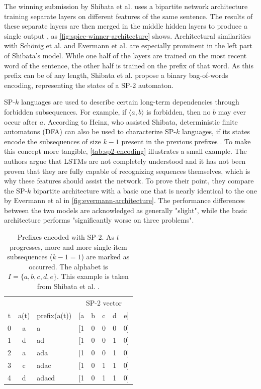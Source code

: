The winning submission by Shibata et al. uses a bipartite network architecture training separate layers on different features of the same sentence. The results of these separate layers are then merged in the middle hidden layers to produce a single output \cite{shibata2016bipartite}, as \autoref{fig:spice-winner-architecture} shows. Architectural similarities with Schönig et al. and Evermann et al. are especially prominent in the left part of Shibata's model.
While one half of the layers are trained on the most recent word of the sentence, the other half is trained on the prefix of that word. As this prefix can be of any length, Shibata et al. propose a binary bag-of-words encoding, representing the states of a SP-2 automaton.

SP-$k$ languages are used to describe certain long-term dependencies through forbidden subsequences. For example, if $\langle a,b \rangle$ is forbidden, then no $b$ may ever occur after $a$. According to Heinz, who assisted Shibata, deterministic finite automatons (DFA) can also be used to characterize SP-$k$ languages, if its states encode the subsequences of size $k-1$  present in the previous prefixes \cite{heinz2010estimatingSP}. To make this concept more tangible, \autoref{tab:sp2-encoding} illustrates a small example. The authors argue that LSTMs are not completely understood and it has not been proven that they are fully capable of recognizing sequences themselves, which is why these features should assist the network. To prove their point, they compare the SP-$k$ bipartite architecture with a basic one that is nearly identical to the one by Evermann et al in \autoref{fig:evermann-architecture}. The performance differences between the two models are acknowledged as generally "slight", while the basic architecture performs "significantly worse on three problems".\\

\begin{table}
    \centering
    \begin{tabular}{cclccccc}
        \hline
          &      &              & \multicolumn{5}{c}{SP-2 vector}\\
        t & a(t) & prefix(a(t)) & [a & b & c & d & e]\\
        \hline
        0 & a    & a            & [1 & 0 & 0 & 0 & 0]\\
        1 & d    & ad           & [1 & 0 & 0 & 1 & 0]\\
        2 & a    & ada          & [1 & 0 & 0 & 1 & 0]\\
        3 & c    & adac         & [1 & 0 & 1 & 1 & 0]\\
        4 & d    & adacd        & [1 & 0 & 1 & 1 & 0]\\
        \hline
    \end{tabular}
    \caption{Prefixes encoded with SP-2. As $t$ progresses, more and more single-item subsequences ($k-1=1$) are marked as occurred. The alphabet is $I=\{a,b,c,d,e\}$. This example is taken from Shibata et al.  \cite{shibata2016bipartite}.}
    \label{tab:sp2-encoding}
\end{table}

